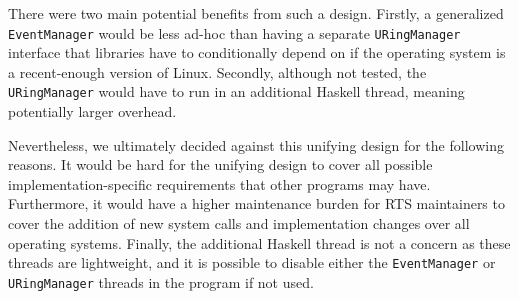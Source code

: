 There were two main potential benefits from such a design. Firstly, a generalized \texttt{EventManager} would be less ad-hoc than having a separate \texttt{URingManager} interface that libraries have to conditionally depend on if the operating system is a recent-enough version of Linux. Secondly, although not tested, the \texttt{URingManager} would have to run in an additional Haskell thread, meaning potentially larger overhead.

Nevertheless, we ultimately decided against this unifying design for the following reasons. It would be hard for the unifying design to cover all possible implementation-specific requirements that other programs may have. Furthermore, it would have a higher maintenance burden for RTS maintainers to cover the addition of new system calls and implementation changes over all operating systems. Finally, the additional Haskell thread is not a concern as these threads are lightweight, and it is possible to disable either the \texttt{EventManager} or \texttt{URingManager} threads in the program if not used.
